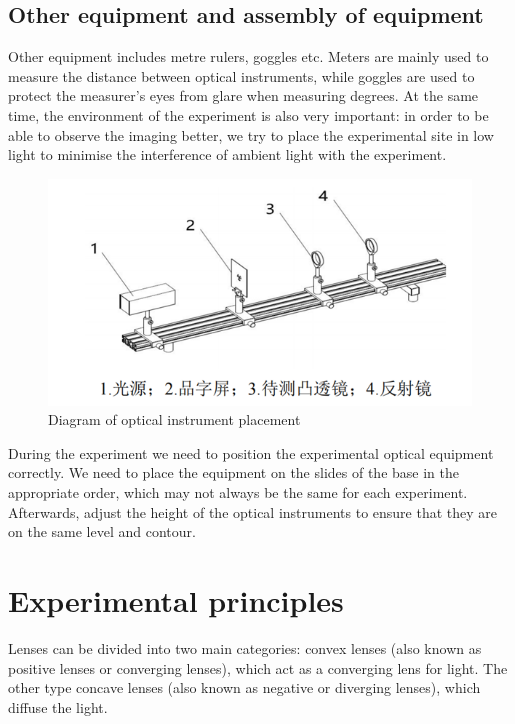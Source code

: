 \documentclass[UTF8]{article}
\begin{document}
	    \subsection{Other equipment and assembly of equipment}
	    Other equipment includes metre rulers, goggles etc. Meters are mainly used to measure the distance between optical instruments, while goggles are used to protect the measurer's eyes from glare when measuring degrees. At the same time, the environment of the experiment is also very important: in order to be able to observe the imaging better, we try to place the experimental site in low light to minimise the interference of ambient light with the experiment.
	   \begin{figure}[H]
	   					\centering
	   					\includegraphics[clip,scale=1,trim={0 30 0 0}]{fig/fig4.png}
	   					\caption{Diagram of optical instrument placement}
	   					\label{figure.4}
	   \end{figure}
	   				
       During the experiment we need to position the experimental optical equipment correctly. We need to place the equipment on the slides of the base in the appropriate order, which may not always be the same for each experiment. Afterwards, adjust the height of the optical instruments to ensure that they are on the same level and contour.
       
      
	\section{Experimental principles}
    Lenses can be divided into two main categories: convex lenses (also known as positive lenses or converging lenses), which act as a converging lens for light. The other type concave lenses (also known as negative or diverging lenses), which diffuse the light.
    
\end{document}

